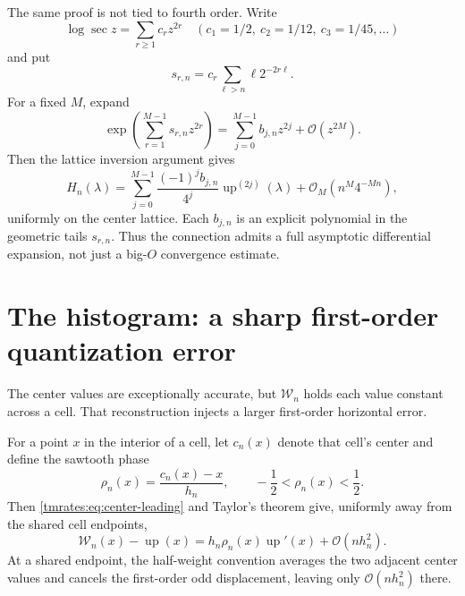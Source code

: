 \documentclass[11pt,oneside]{article}
\theoremstyle{definition}
\theoremstyle{remark}
\newcommand{\Up}{\operatorname{up}}
\newcommand{\bigO}{\mathcal O}
\begin{document}
The same proof is not tied to fourth order.  Write
\begin{equation}
 \log\sec z=\sum_{r\ge1}c_rz^{2r}
 \quad(c_1=1/2,\ c_2=1/12,\ c_3=1/45,\ldots)              \label{tmrates:eq:logsec-full}
\end{equation}
and put
\begin{equation}
 s_{r,n}=c_r\sum_{\ell>n}\ell2^{-2r\ell}.                 \label{tmrates:eq:srn}
\end{equation}
For a fixed $M$, expand
\begin{equation}
 \exp\left(\sum_{r=1}^{M-1}s_{r,n}z^{2r}\right)
 =\sum_{j=0}^{M-1}b_{j,n}z^{2j}+\bigO(z^{2M}).             \label{tmrates:eq:bjn}
\end{equation}
Then the lattice inversion argument gives
\begin{equation}
 H_n(\lambda)
 =\sum_{j=0}^{M-1}\frac{(-1)^j b_{j,n}}{4^j}
    \Up^{(2j)}(\lambda)
 +\bigO_M\!\left(n^M4^{-Mn}\right),                      \label{tmrates:eq:all-orders}
\end{equation}
uniformly on the center lattice.  Each $b_{j,n}$ is an explicit polynomial in the geometric
tails $s_{r,n}$.  Thus the connection admits a full asymptotic differential expansion, not
just a big-$O$ convergence estimate.

\section{The histogram: a sharp first-order quantization error}
\label{tmrates:sec:histogram-rate}

The center values are exceptionally accurate, but $\mathcal W_n$ holds each value constant
across a cell.  That reconstruction injects a larger first-order horizontal error.

For a point $x$ in the interior of a cell, let $c_n(x)$ denote that cell's center and define
the sawtooth phase
\begin{equation}
 \rho_n(x)=\frac{c_n(x)-x}{h_n},
 \qquad -\frac12<\rho_n(x)<\frac12.                       \label{tmrates:eq:rho}
\end{equation}
Then \eqref{tmrates:eq:center-leading} and Taylor's theorem give, uniformly away from the shared cell
endpoints,
\begin{equation}
 \mathcal W_n(x)-\Up(x)
 =h_n\rho_n(x)\Up'(x)+\bigO(nh_n^2).                      \label{tmrates:eq:hist-local}
\end{equation}
At a shared endpoint, the half-weight convention averages the two adjacent center values and
cancels the first-order odd displacement, leaving only $\bigO(nh_n^2)$ there.
\end{document}
